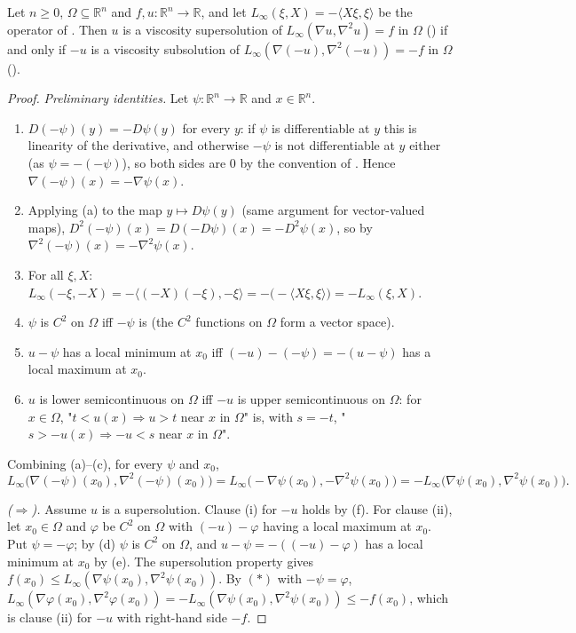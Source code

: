 \begin{lemma}
Let $n\ge0$, $\Omega\subseteq\mathbb R^n$ and $f,u:\mathbb R^n\to\mathbb R$, and let $L_\infty(\xi,X)=-\langle X\xi,\xi\rangle$ be the operator of . Then $u$ is a viscosity supersolution of $L_\infty(\nabla u,\nabla^2u)=f$ in $\Omega$ () if and only if $-u$ is a viscosity subsolution of $L_\infty(\nabla(-u),\nabla^2(-u))=-f$ in $\Omega$ ().
\end{lemma}
\begin{proof}
\emph{Preliminary identities.} Let $\psi:\mathbb R^n\to\mathbb R$ and $x\in\mathbb R^n$.
\begin{enumerate}
\item[(a)] $D(-\psi)(y)=-D\psi(y)$ for every $y$: if $\psi$ is differentiable at $y$ this is linearity of the derivative, and otherwise $-\psi$ is not differentiable at $y$ either (as $\psi=-(-\psi)$), so both sides are $0$ by the convention of . Hence $\nabla(-\psi)(x)=-\nabla\psi(x)$.
\item[(b)] Applying (a) to the map $y\mapsto D\psi(y)$ (same argument for vector-valued maps), $D^2(-\psi)(x)=D(-D\psi)(x)=-D^2\psi(x)$, so by  $\nabla^2(-\psi)(x)=-\nabla^2\psi(x)$.
\item[(c)] For all $\xi,X$: $L_\infty(-\xi,-X)=-\langle(-X)(-\xi),-\xi\rangle=-\bigl(-\langle X\xi,\xi\rangle\bigr)=-L_\infty(\xi,X)$.
\item[(d)] $\psi$ is $C^2$ on $\Omega$ iff $-\psi$ is (the $C^2$ functions on $\Omega$ form a vector space).
\item[(e)] $u-\psi$ has a local minimum at $x_0$ iff $(-u)-(-\psi)=-(u-\psi)$ has a local maximum at $x_0$.
\item[(f)] $u$ is lower semicontinuous on $\Omega$ iff $-u$ is upper semicontinuous on $\Omega$: for $x\in\Omega$, "$t<u(x)\Rightarrow u>t$ near $x$ in $\Omega$" is, with $s=-t$, "$s>-u(x)\Rightarrow -u<s$ near $x$ in $\Omega$".
\end{enumerate}
Combining (a)--(c), for every $\psi$ and $x_0$,
\[
L_\infty\bigl(\nabla(-\psi)(x_0),\nabla^2(-\psi)(x_0)\bigr)=L_\infty\bigl(-\nabla\psi(x_0),-\nabla^2\psi(x_0)\bigr)=-L_\infty\bigl(\nabla\psi(x_0),\nabla^2\psi(x_0)\bigr). \tag{$*$}
\]

\emph{($\Rightarrow$).} Assume $u$ is a supersolution. Clause (i) for $-u$ holds by (f). For clause (ii), let $x_0\in\Omega$ and $\varphi$ be $C^2$ on $\Omega$ with $(-u)-\varphi$ having a local maximum at $x_0$. Put $\psi=-\varphi$; by (d) $\psi$ is $C^2$ on $\Omega$, and $u-\psi=-((-u)-\varphi)$ has a local minimum at $x_0$ by (e). The supersolution property gives $f(x_0)\le L_\infty(\nabla\psi(x_0),\nabla^2\psi(x_0))$. By $(*)$ with $-\psi=\varphi$, $L_\infty(\nabla\varphi(x_0),\nabla^2\varphi(x_0))=-L_\infty(\nabla\psi(x_0),\nabla^2\psi(x_0))\le-f(x_0)$, which is clause (ii) for $-u$ with right-hand side $-f$.


\end{proof}
